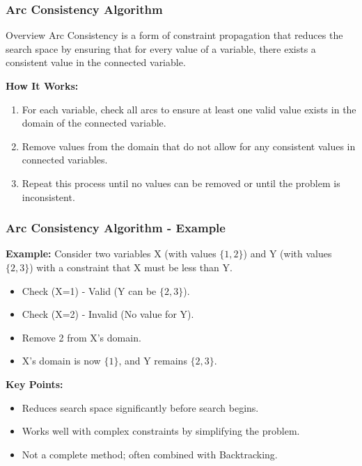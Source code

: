 \documentclass[aspectratio=169]{beamer}
\begin{document}
\begin{frame}[fragile]
    \frametitle{Arc Consistency Algorithm}
    
    \begin{block}{Overview}
        Arc Consistency is a form of constraint propagation that reduces the search space by ensuring that for every value of a variable, there exists a consistent value in the connected variable.
    \end{block}
    
    \textbf{How It Works:}
    \begin{enumerate}
        \item For each variable, check all arcs to ensure at least one valid value exists in the domain of the connected variable.
        \item Remove values from the domain that do not allow for any consistent values in connected variables.
        \item Repeat this process until no values can be removed or until the problem is inconsistent.
    \end{enumerate}
\end{frame}

\begin{frame}
    \frametitle{Arc Consistency Algorithm - Example}
    
    \textbf{Example:}
    Consider two variables X (with values $\{1, 2\}$) and Y (with values $\{2, 3\}$) with a constraint that X must be less than Y.
    
    \begin{itemize}
        \item Check (X=1) - Valid (Y can be $\{2,3\}$).
        \item Check (X=2) - Invalid (No value for Y).
        \item Remove 2 from X's domain.
        \item X’s domain is now $\{1\}$, and Y remains $\{2, 3\}$.
    \end{itemize}
    
    \textbf{Key Points:}
    \begin{itemize}
        \item Reduces search space significantly before search begins.
        \item Works well with complex constraints by simplifying the problem.
        \item Not a complete method; often combined with Backtracking.
    \end{itemize}
\end{frame}
\end{document}
